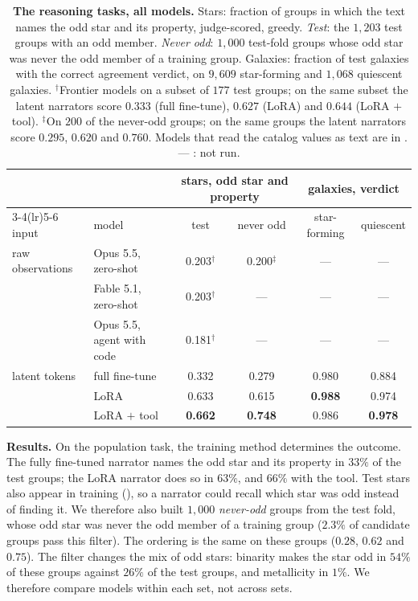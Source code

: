 \begin{table}[t]\centering\small
\caption{\textbf{The reasoning tasks, all models.} Stars: fraction of groups in which the text
names the odd star and its property, judge-scored, greedy. \emph{Test}: the $1{,}203$ test
groups with an odd member. \emph{Never odd}: $1{,}000$ test-fold groups whose odd star was never
the odd member of a training group. Galaxies: fraction of test
galaxies with the correct agreement verdict, on $9{,}609$ star-forming and $1{,}068$ quiescent
galaxies. $^\dagger$Frontier models on a subset of $177$ test groups; on the same subset
the latent narrators score $0.333$ (full fine-tune), $0.627$ (LoRA) and $0.644$ (LoRA $+$ tool).
$^\ddagger$On $200$ of the never-odd groups; on the same groups the latent narrators score
$0.295$, $0.620$ and $0.760$. Models that read the catalog values as text are in
. --- : not run.}
\label{tab:group}
\begin{tabular}{llcccc}
\toprule
 & & \multicolumn{2}{c}{stars, odd star and property} & \multicolumn{2}{c}{galaxies, verdict} \\
\cmidrule(lr){3-4}\cmidrule(lr){5-6}
input & model & test & never odd & star-forming & quiescent \\
\midrule
raw observations & Opus 5.5, zero-shot     & 0.203$^\dagger$ & 0.200$^\ddagger$ & --- & --- \\
                 & Fable 5.1, zero-shot    & 0.203$^\dagger$ & --- & --- & --- \\
                 & Opus 5.5, agent with code & 0.181$^\dagger$ & --- & --- & --- \\
\midrule
latent tokens    & full fine-tune          & 0.332 & 0.279 & 0.980 & 0.884 \\
                 & LoRA                    & 0.633 & 0.615 & \textbf{0.988} & 0.974 \\
                 & LoRA $+$ tool           & \textbf{0.662} & \textbf{0.748} & 0.986 & \textbf{0.978} \\
\bottomrule
\end{tabular}
\end{table}

\textbf{Results.} On the population task, the training method determines the outcome. The fully
fine-tuned narrator names the odd star and its property in $33\%$ of the test groups; the LoRA
narrator does so in $63\%$, and $66\%$ with the tool. Test stars also appear in training
(), so a narrator could recall which star was odd instead of finding it. We
therefore also built $1{,}000$ \emph{never-odd} groups from the test fold, whose odd star was
never the odd member of a training group ($2.3\%$ of candidate groups pass this filter). The
ordering is the same on these groups ($0.28$, $0.62$ and $0.75$). The filter changes the mix of
odd stars: binarity makes the star odd in $54\%$ of these groups against $26\%$ of the test
groups, and metallicity in $1\%$. We therefore compare models within each set, not across sets.

